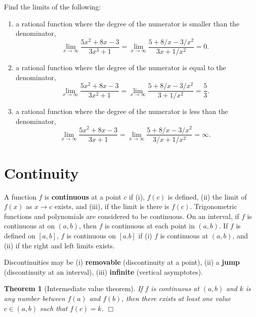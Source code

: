 \documentclass[letter-paper]{tufte-book}
\newtheorem{theorem}{\color{pastel-blue}Theorem}[section]
\newenvironment{example}[1][Example]{\begin{trivlist}
\item[\hskip \labelsep {\bfseries #1}]}{\end{trivlist}}
\newcommand\Def[1]{\textbf{#1}}
\newcommand{\qedwhite}{\hfill \ensuremath{\Box}}
\begin{document}
\begin{example}
  Find the limits of the following:
  \begin{enumerate}
    \item a rational function where the degree of the numerator is smaller than 
    the denominator,
    \begin{equation*}
      \lim_{x\to\infty}\frac{5x^2+8x-3}{3x^3+1}=
      \lim_{x\to\infty}\frac{5+8/x-3/x^2}{3x+1/x^2}=0.
    \end{equation*}
    
    \item a rational function where the degree of the numerator is equal to the 
    denominator,
    \begin{equation*}
      \lim_{x\to\infty}\frac{5x^2+8x-3}{3x^2+1}=
      \lim_{x\to\infty}\frac{5+8/x-3/x^2}{3+1/x^2}=\frac{5}{3}.
    \end{equation*}
    
    \item a rational function where the degree of the numerator is less than the 
    denominator,
    \begin{equation*}
      \lim_{x\to\infty}\frac{5x^2+8x-3}{3x+1}=
      \lim_{x\to\infty}\frac{5+8/x-3/x^2}{3/x+1/x^2}=\infty.
    \end{equation*}
  \end{enumerate}
\end{example}


\section{Continuity}

A function $f$ is \Def{continuous} at a point $c$ if (i), $f(c)$
is defined, (ii) the limit of $f(x)$ as $x\to c$ exists, and (iii), if the
limit is there is $f(c)$. Trigonometric functions and polynomials are considered
to be continuous. On an interval, if $f$ is continuous at on $(a,b)$, then $f$
is continuous at each point in $(a,b)$. If $f$ is defined on $[a,b]$, $f$ is
continuous on $[a.b]$ if (i) $f$ is continuous at $(a,b)$, and (ii) if the right
and left limits exists.

Discontinuities may be (i) \Def{removable} (discontinuity at a point),
(ii) a \Def{jump} (discontinuity at an interval), (iii)
\Def{infinite} (vertical asymptotes).

\begin{theorem}[Intermediate value theorem]
  If $f$ is continuous at $(a,b)$ and $k$ is any number between $f(a)$ and
  $f(b)$, then there exists at least one value $c\in(a,b)$ such that $f(c)=k$. \qedwhite
\end{theorem}
\end{document}
